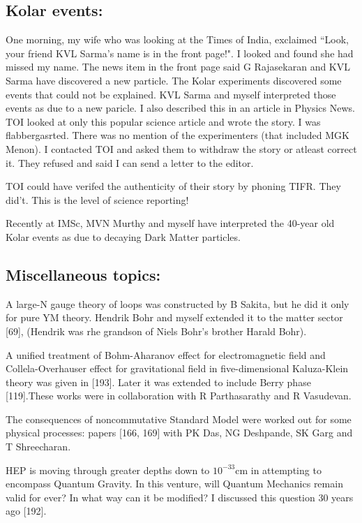 \subsection*{Kolar events:}
\vskip -8pt
One morning, my wife who was looking at the Times of India, exclaimed 
``Look, your friend KVL Sarma's name is in the front page!". I looked and 
found she had missed my name. The news item in the front page said G 
Rajasekaran and KVL Sarma have discovered a new particle. The Kolar 
experiments discovered some events that could not be explained. KVL 
Sarma and myself interpreted those events as due to a new paricle. I 
also described this in an article in Physics News. TOI looked at only 
this po\-pular science article and wrote the story. I was flabbergasrted. 
There was no mention of the experimenters (that included MGK Menon). I 
contacted TOI and asked them to withdraw the story or atleast correct 
it. They refused and said I can send a letter to the editor.

TOI could have verifed the authenticity of their story by pho\-ning TIFR. 
They did't. This is the level of science repor\-ting!

Recently at IMSc, MVN Murthy and myself have interpreted the 40-year old 
Kolar events as due to decaying Dark Matter parti\-cles.


\subsection*{Miscellaneous topics:}

A large-N gauge theory of loops was constructed by B Sakita, but he did 
it only for pure YM theory. Hendrik Bohr and myself extended it to the 
matter sector [69], (Hendrik was rhe grandson of Niels Bohr's brother 
Harald Bohr).

A unified treatment of Bohm-Aharanov effect for electromagnetic field 
and Collela-Overhauser effect for gravitational field in 
five-dimensional Kaluza-Klein theory was given in [193]. Later it was 
extended to include Berry phase [119].These works were in collaboration 
with R Parthasarathy and R Vasudevan.


The consequences of noncommutative Standard Model were worked out for 
some physical processes: papers [166, 169] with PK Das, NG Deshpande, SK 
Garg and T Shreecharan.


HEP is moving through greater depths down to $10^{-33}$cm in attempting 
to encompass Quantum Gravity. In this venture, will Quantum Mechanics 
remain valid for ever? In what way can it be modified? I discussed this 
question 30 years ago [192].

